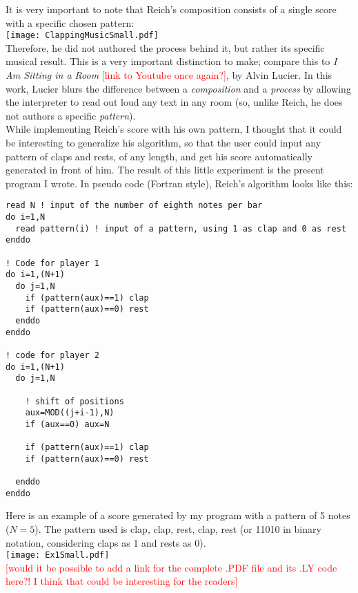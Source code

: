 \documentclass{article}
\begin{document}
It is very important to note that Reich's composition consists of a single score with a specific chosen pattern: \\

\texttt{[image: ClappingMusicSmall.pdf]} \\

Therefore, he did not authored the process behind it, but rather its specific musical result. 
This is a very important distinction to make; compare this to \textit{I Am Sitting in a Room} \textcolor{red}{[link to Youtube once again?]}, by Alvin Lucier. 
In this work, Lucier blurs the difference between a \textit{composition} and a \textit{process} by allowing the interpreter to read out loud any text in any room (so, unlike Reich, he does not authors a specific \textit{pattern}). \\

While implementing Reich's score with his own pattern, I thought that it could be interesting to generalize his algorithm, so that the user could input any  pattern of claps and rests, of any length, and get his score automatically generated in front of him. 
The result of this little experiment is the present program I wrote. 
In pseudo code (Fortran style), Reich's algorithm looks like this: \\

\begin{verbatim}
read N ! input of the number of eighth notes per bar
do i=1,N
  read pattern(i) ! input of a pattern, using 1 as clap and 0 as rest
enddo

! Code for player 1
do i=1,(N+1)
  do j=1,N
    if (pattern(aux)==1) clap
    if (pattern(aux)==0) rest
  enddo
enddo

! code for player 2
do i=1,(N+1)
  do j=1,N

    ! shift of positions
    aux=MOD((j+i-1),N)
    if (aux==0) aux=N

    if (pattern(aux)==1) clap
    if (pattern(aux)==0) rest

  enddo
enddo
\end{verbatim}

Here is an example of a score generated by my program with a pattern of 5 notes ($N=5$). 
The pattern used is clap, clap, rest, clap, rest (or 11010 in binary notation, considering claps as 1 and rests as 0). \\

\texttt{[image: Ex1Small.pdf]} \\

\textcolor{red}{[would it be possible to add a link for the complete .PDF file and its .LY code here?! I think that could be interesting for the readers]} \\
\end{document}
